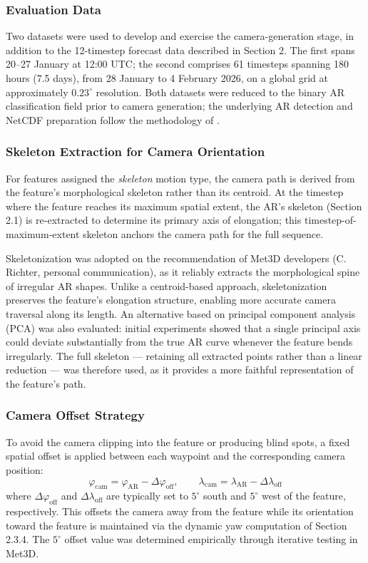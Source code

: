 \documentclass[journal abbreviation, manuscript]{copernicus}
\begin{document}
\subsubsection{Evaluation Data}
Two datasets were used to develop and exercise the camera-generation stage, in addition to the 12-timestep forecast data described in Section 2. The first spans 20--27 January at 12:00 UTC; the second comprises 61 timesteps spanning 180 hours (7.5 days), from 28 January to 4 February 2026, on a global grid at approximately $0.23^{\circ}$ resolution. Both datasets were reduced to the binary AR classification field prior to camera generation; the underlying AR detection and NetCDF preparation follow the methodology of \citep{gmd2025}.

\subsubsection{Skeleton Extraction for Camera Orientation}
For features assigned the \textit{skeleton} motion type, the camera path is derived from the feature's morphological skeleton rather than its centroid. At the timestep where the feature reaches its maximum spatial extent, the AR's skeleton (Section 2.1) is re-extracted to determine its primary axis of elongation; this timestep-of-maximum-extent skeleton anchors the camera path for the full sequence.

Skeletonization was adopted on the recommendation of Met3D developers (C. Richter, personal communication), as it reliably extracts the morphological spine of irregular AR shapes. Unlike a centroid-based approach, skeletonization preserves the feature's elongation structure, enabling more accurate camera traversal along its length. An alternative based on principal component analysis (PCA) was also evaluated: initial experiments showed that a single principal axis could deviate substantially from the true AR curve whenever the feature bends irregularly. The full skeleton --- retaining all extracted points rather than a linear reduction --- was therefore used, as it provides a more faithful representation of the feature's path.

\subsubsection{Camera Offset Strategy}
To avoid the camera clipping into the feature or producing blind spots, a fixed spatial offset is applied between each waypoint and the corresponding camera position:
\begin{equation}
\varphi_{\mathrm{cam}} = \varphi_{\mathrm{AR}} - \Delta\varphi_{\mathrm{off}},
\qquad
\lambda_{\mathrm{cam}} = \lambda_{\mathrm{AR}} - \Delta\lambda_{\mathrm{off}}
\tag{10}
\end{equation}
where $\Delta\varphi_{\mathrm{off}}$ and $\Delta\lambda_{\mathrm{off}}$ are typically set to $5^{\circ}$ south and $5^{\circ}$ west of the feature, respectively. This offsets the camera away from the feature while its orientation toward the feature is maintained via the dynamic yaw computation of Section 2.3.4. The $5^{\circ}$ offset value was determined empirically through iterative testing in Met3D.
\end{document}
